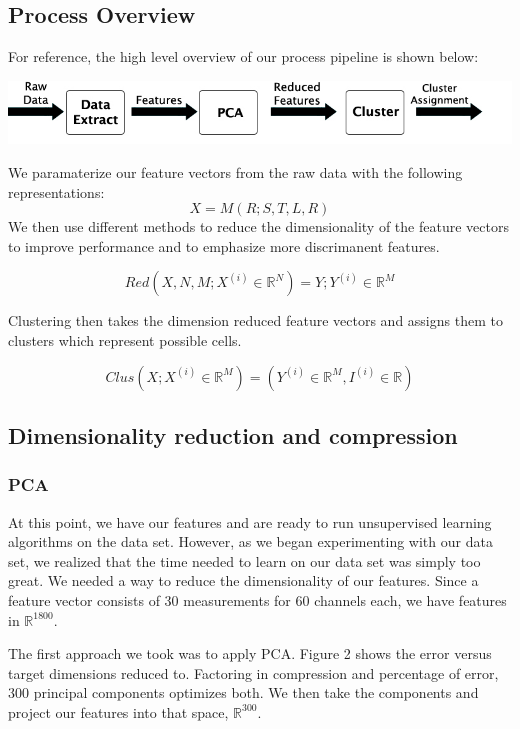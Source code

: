 \documentclass[conference]{IEEEtran}
\begin{document}
\subsection{Process Overview}

For reference, the high level overview of our process pipeline is shown
below: 
\begin{center}
  \includegraphics[width=0.8\linewidth]{../poster/images/pipeline.jpg}
\end{center}

We paramaterize our feature vectors from the raw data with the following representations:
$$X = M(R; S,T,L,R)$$
We then use different methods to reduce the dimensionality of
the feature vectors to improve performance and to emphasize
more discrimanent features.

$$Red(X, N, M; X^{(i)} \in \mathbb{R}^N) = Y; Y^{(i)} \in \mathbb{R}^M$$

Clustering then takes the dimension reduced feature vectors
and assigns them to clusters which represent possible cells.

 $$Clus(X; X^{(i)} \in \mathbb{R}^M) = (Y^{(i)} \in
  \mathbb{R}^M,I^{(i)} \in \mathbb{R})$$

\subsection{Dimensionality reduction and compression}
\subsubsection{PCA}
At this point, we have our features and are ready to run unsupervised
learning algorithms on the data set. However, as we began experimenting
with our data set, we realized that the time needed to learn on our data
set was simply too great. We needed a way to reduce the dimensionality of
our features. Since a feature vector consists of 30 measurements for 60
channels each, we have features in $\mathbb{R}^{1800}$.

The first approach we took was to apply PCA. Figure 2 shows the error
versus target dimensions reduced to. Factoring in compression and
percentage of error, 300 principal components optimizes both.
We then take the components and project our features into that space, $\mathbb{R}^{300}$.
\end{document}
